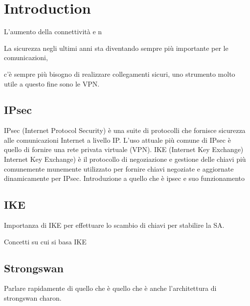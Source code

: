 \documentclass[
10pt, %
a4paper, %
oneside, %
headinclude,footinclude, %
BCOR5mm, %
]{scrartcl}
\begin{document}

\newpage %


\section{Introduction}

L'aumento della connettività e n

La sicurezza negli ultimi anni sta diventando sempre più importante per le comunicazioni, 

c'è sempre più bisogno di realizzare collegamenti sicuri, uno strumento molto utile a questo fine sono le VPN.



\subsection{IPsec}

IPsec (Internet Protocol Security) è una suite di protocolli che fornisce sicurezza alle comunicazioni Internet a livello IP. L'uso attuale più comune di IPsec è quello di fornire una rete privata virtuale (VPN).  IKE (Internet Key Exchange)
   Internet Key Exchange) è il protocollo di negoziazione e gestione delle chiavi più comunemente munemente utilizzato per fornire chiavi negoziate e aggiornate dinamicamente per IPsec.
Introduzione a quello che è ipsec e suo funzionamento

\subsection{IKE}


Importanza di IKE per effettuare lo scambio di chiavi per stabilire la SA.

Concetti su cui si basa IKE

\subsection{Strongswan}

Parlare rapidamente di quello che è
quello che è anche l'architettura di strongswan charon.
\end{document}
